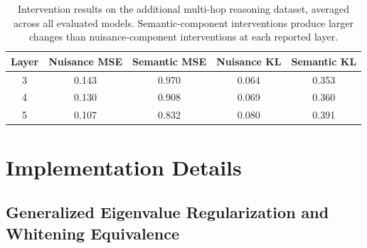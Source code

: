 \begin{table}[!htbp]
    \centering
    \small
    \begin{tabular}{ccccc}
        \toprule
        Layer
        & Nuisance MSE
        & Semantic MSE
        & Nuisance KL
        & Semantic KL \\
        \midrule
        3 & 0.143 & 0.970 & 0.064 & 0.353 \\
        4 & 0.130 & 0.908 & 0.069 & 0.360 \\
        5 & 0.107 & 0.832 & 0.080 & 0.391 \\
        \bottomrule
    \end{tabular}
\vspace{0.4em}
\caption{Intervention results on the additional multi-hop reasoning dataset, averaged across all evaluated models. Semantic-component interventions produce larger changes than nuisance-component interventions at each reported layer.}
\label{tab:multihop_validation}
\vspace{-1.0em}
\end{table}


\section{Implementation Details}
\label{appendix: implementation}


\subsection{Generalized Eigenvalue Regularization and Whitening Equivalence}
\label{app:whitening}

